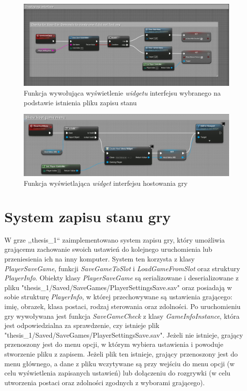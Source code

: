 \documentclass[multip]{SGGW-thesis}
\begin{document}
	\begin{figure}
		\centering
			\includegraphics[width=1\textwidth]{figures/savegamecheck.jpg}
		\caption{Funkcja wywołująca wyświetlenie {\em widgetu} interfejsu wybranego na podstawie istnienia pliku zapisu stanu}
		\label{fig-save-game-check}
	\end{figure}
	
	\begin{figure}
		\centering
			\includegraphics[width=1\textwidth]{figures/showhostmenu.jpg}
		\caption{Funkcja wyświetlająca {\em widget} interfejsu hostowania gry}
		\label{fig-show-host-menu}
	\end{figure}

\clearpage
\section{System zapisu stanu gry}
	\label{sejwy}
	W grze ,,thesis\_1`` zaimplementowano system zapisu gry, który umożliwia grającemu zachowanie swoich ustawień do kolejnego uruchomienia lub przeniesienia ich na inny komputer. System ten korzysta z klasy {\em PlayerSaveGame}, funkcji {\em SaveGameToSlot} i {\em LoadGameFromSlot} oraz struktury {\em PlayerInfo}. Obiekty klasy {\em PlayerSaveGame} są serializowane i deserializowane z pliku "thesis\_1/Saved/SaveGames/PlayerSettingsSave.sav" oraz posiadają w sobie strukturę {\em PlayerInfo}, w której przechowywane są ustawienia grającego: imię, obrazek, klasa postaci, rodzaj sterowania oraz zdolności.
	\newline Po uruchomieniu gry wywoływana jest funkcja {\em SaveGameCheck} z klasy {\em GameInfoInstance}, która jest odpowiedzialna za sprawdzenie, czy istnieje plik \newline "thesis\_1/Saved/SaveGames/PlayerSettingsSave.sav". Jeżeli nie istnieje, grający przenoszony jest do menu opcji, w którym wybiera ustawienia i powoduje stworzenie pliku z zapisem. Jeżeli plik ten istnieje, grający przenoszony jest do menu głównego, a dane z pliku wczytywane są przy wejściu do menu opcji (w celu wyświetlenia zapisanych ustawień) lub dołączeniu do rozgrywki (w celu utworzenia postaci oraz zdolności zgodnych z wyborami grającego). 
\end{document}
